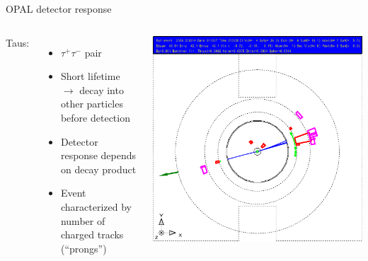 \documentclass[11pt,xcolor=dvipsnames,professionalfonts]{beamer}
\begin{document}
\begin{frame}{OPAL detector response}
	\begin{columns}
		Taus:
		\begin{itemize}
			\setlength\itemsep{.5em}
			\item $\tau^+\tau^-$ pair
			\item Short lifetime $\rightarrow$ decay into other particles before detection
			\item Detector response depends on decay product
			\item Event characterized by number of charged tracks (``prongs'')
		\end{itemize}
		\includegraphics[width=1.0\textwidth]{./talkfigs/pdf/tt_05.pdf}
	\end{columns}
\end{frame}
\end{document}
